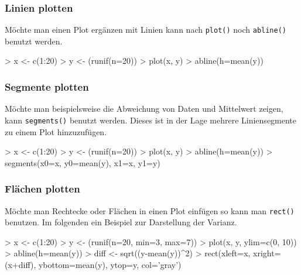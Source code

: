\subsubsection{Linien plotten}
Möchte man einen Plot ergänzen mit Linien kann nach \lstinline{plot()}
noch \lstinline{abline()} benutzt werden.

\begin{Schunk}
\begin{Sinput}
> x <- c(1:20)
> y <- (runif(n=20))
> plot(x, y)
> abline(h=mean(y))
\end{Sinput}
\end{Schunk}

\subsubsection{Segmente plotten}
Möchte man beispielsweise die Abweichung von Daten und Mittelwert
zeigen, kann \lstinline{segments()} benutzt werden. Dieses ist in der
Lage mehrere Liniensegmente zu einem Plot hinzuzufügen.

\begin{Schunk}
\begin{Sinput}
> x <- c(1:20)
> y <- (runif(n=20))
> plot(x, y)
> abline(h=mean(y))
> segments(x0=x, y0=mean(y), x1=x, y1=y)
\end{Sinput}
\end{Schunk}

\subsubsection{Flächen plotten}
Möchte man Rechtecke oder Flächen in einen Plot einfügen so kann man 
\lstinline{rect()} benutzen. Im folgenden ein Beispiel zur Darstellung
der Varianz.

\begin{Schunk}
\begin{Sinput}
> x <- c(1:20)
> y <- (runif(n=20, min=3, max=7))
> plot(x, y, ylim=c(0, 10))
> abline(h=mean(y))
> diff <- sqrt((y-mean(y))^2)
> rect(xleft=x, xright=(x+diff), ybottom=mean(y), ytop=y, col='gray')
\end{Sinput}
\end{Schunk}

